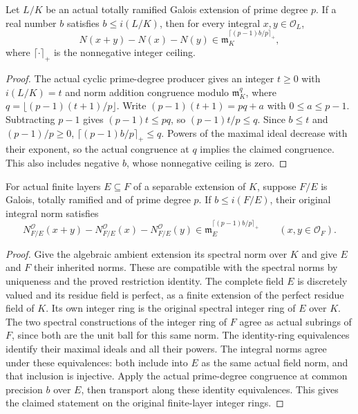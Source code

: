 \begin{lemma}
\label{fw:prime-norm-common-precision}
\leanok
Let $L/K$ be an actual totally ramified Galois extension of prime
degree $p$. If a real number $b$ satisfies $b\leq i(L/K)$, then
for every integral $x,y\in\mathcal O_L$,
\[
 N(x+y)-N(x)-N(y)\in
 \mathfrak m_K^{\lceil (p-1)b/p\rceil_+},
\]
where $\lceil\cdot\rceil_+$ is the nonnegative integer ceiling.
\end{lemma}
\begin{proof}
The actual cyclic prime-degree producer gives an integer $t\geq0$
with $i(L/K)=t$ and norm addition congruence modulo
$\mathfrak m_K^q$, where $q=\lfloor(p-1)(t+1)/p\rfloor$.
Write $(p-1)(t+1)=pq+a$ with $0\leq a\leq p-1$.
Subtracting $p-1$ gives $(p-1)t\leq pq$, so
$(p-1)t/p\leq q$. Since $b\leq t$ and $(p-1)/p\geq0$,
$\lceil(p-1)b/p\rceil_+\leq q$. Powers of the maximal ideal
decrease with their exponent, so the actual congruence at $q$
implies the claimed congruence. This also includes negative $b$,
whose nonnegative ceiling is zero.
\end{proof}

\begin{lemma}
\label{fw:finite-layer-prime-norm-congruence}
\leanok
For actual finite layers $E\subseteq F$ of a separable extension
of $K$, suppose $F/E$ is Galois, totally ramified and of prime
degree $p$. If $b\leq i(F/E)$, their original integral norm satisfies
\[
 N^{\mathcal O}_{F/E}(x+y)-N^{\mathcal O}_{F/E}(x)
    -N^{\mathcal O}_{F/E}(y)
 \in\mathfrak m_E^{\lceil(p-1)b/p\rceil_+}
 \qquad(x,y\in\mathcal O_F).
\]
\end{lemma}
\begin{proof}
Give the algebraic ambient extension its spectral norm over $K$
and give $E$ and $F$ their inherited norms. These are compatible
with the spectral norms by uniqueness and the proved restriction
identity. The complete field $E$ is discretely valued
and its residue field is perfect, as a finite extension of the
perfect residue field of $K$. Its own integer ring is the
original spectral integer ring of $E$ over $K$. The two spectral
constructions of the integer ring of $F$ agree as actual subrings
of $F$, since both are the unit ball for this same norm.
The identity-ring equivalences identify their maximal ideals and
all their powers. The integral norms agree under these equivalences:
both include into $E$ as the same actual field norm, and that
inclusion is injective. Apply the actual prime-degree congruence
at common precision $b$ over $E$, then transport along these
identity equivalences. This gives the claimed statement on the
original finite-layer integer rings.
\end{proof}

